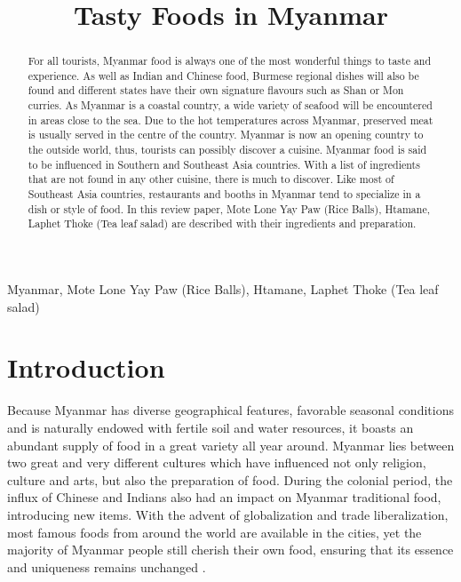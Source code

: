\documentclass[conference]{IEEEtran}
\begin{document}
\title{Tasty Foods in Myanmar}

\author{
}

\maketitle

\begin{abstract}
For all tourists, Myanmar food is always one of the most wonderful things to taste and experience. As well as Indian and Chinese food, Burmese regional dishes will also be found and different states have their own signature flavours such as Shan or Mon curries. As Myanmar is a coastal country, a wide variety of seafood will be encountered in areas close to the sea. Due to the hot temperatures across Myanmar, preserved meat is usually served in the centre of the country.
Myanmar is now an opening country to the outside world, thus, tourists can possibly discover a cuisine. Myanmar food is said to be influenced in Southern and Southeast Asia countries. With a list of ingredients that are not found in any other cuisine, there is much to discover. Like most of Southeast Asia countries, restaurants and booths in Myanmar tend to specialize in a dish or style of food. In this review paper, Mote Lone Yay Paw (Rice Balls), Htamane, Laphet Thoke (Tea leaf salad) are described with their ingredients and preparation.\end{abstract}

\begin{IEEEkeywords}
Myanmar, Mote Lone Yay Paw (Rice Balls), Htamane, Laphet Thoke (Tea leaf salad)
\end{IEEEkeywords}

\section{Introduction}
Because Myanmar has diverse geographical features, favorable seasonal conditions and is naturally endowed with fertile soil and water resources, it boasts an abundant supply of food in a great variety all year around. Myanmar lies between two great and very different cultures which have influenced not only religion, culture and arts, but also the preparation of food. During the colonial period, the influx of Chinese and Indians also had an impact on Myanmar traditional food, introducing new items. With the advent of globalization and trade liberalization, most famous foods from around the world are available in the cities, yet the majority of Myanmar people still cherish their own food, ensuring that its essence and uniqueness remains unchanged \cite{b1}.
\end{document}
